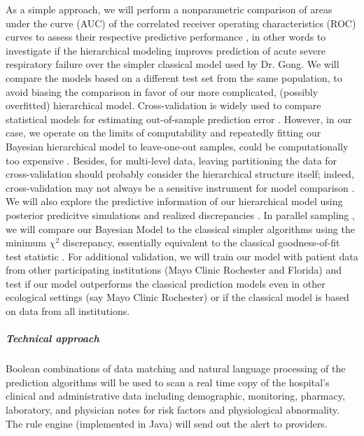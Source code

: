 \documentclass[11pt,notitlepage]{article}
\begin{document}
As a simple approach, we will perform a nonparametric comparison of areas under the curve (AUC) of the correlated receiver operating characteristics (ROC) curves \cite{DeLong_3203132} to assess their respective predictive performance \cite{Newcombe_22890972,Wu_20473190}, in other words to investigate if the hierarchical modeling improves prediction of acute severe respiratory failure over the simpler classical model used by Dr. Gong. We will compare the models based on a different test set from the same population, to avoid biasing the comparison in favor of our more complicated, (possibly overfitted) hierarchical model. Cross-validation is widely used to compare statistical models for estimating out-of-sample prediction error \cite{Vehtari_12396570}. However, in our case, we operate on the limits of computability and repeatedly fitting our Bayesian hierarchical model to leave-one-out samples, could be computationally too expensive \cite{Gelman_Aki_2014predictive}. Besides, for multi-level data, leaving partitioning the data for cross-validation should probably consider the hierarchical structure itself; indeed, cross-validation may not always be a sensitive instrument for model comparison \cite{wang_predictive_2014}. We will also explore the predictive information of our hierarchical model using posterior predicitve simulations and realized discrepancies \cite{Gelman_Aki_2014predictive,Gelman_predictive_2000,GelmanMengStern1996}. In parallel sampling \cite{Congdon_modelcomparison_2005}, we will compare our Bayesian Model to the classical simpler algorithms using the minimum $\chi^{2}$ discrepancy, essentially equivalent to the classical goodness-of-fit test statistic \cite{GelmanMengStern1996}. For additional validation, we will train our model with patient data from other participating institutions (Mayo Clinic Rochester and Florida) and test if our model outperforms the classical prediction models even in other ecological settings (say Mayo Clinic Rochester) or if the classical model is based on data from all institutions.



\subparagraph*{Technical approach}
Boolean combinations of data matching and natural language processing of the prediction algorithms will be used to scan a real time copy of the hospital's clinical and administrative data including demographic, monitoring, pharmacy, laboratory, and physician notes for risk factors and physiological abnormality. The rule engine (implemented in Java) will send out the alert to providers.
\end{document}
